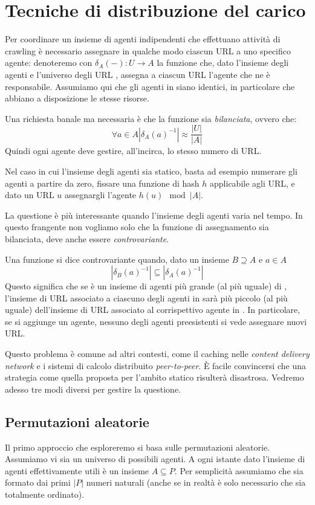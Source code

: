 \chapter{Tecniche di distribuzione del carico}
Per coordinare un insieme  di agenti indipendenti che effettuano attività di crawling è necessario assegnare in qualche modo ciascun URL a uno specifico agente: denoteremo con $\delta_A(-): U \rightarrow A$ la funzione che, dato l'insieme degli agenti  e l'universo degli URL , assegna a ciascun URL l'agente che ne è responsabile. Assumiamo qui che gli agenti in  siano identici, in particolare che abbiano a disposizione le stesse risorse.

Una richiesta banale ma necessaria è che la funzione sia \textit{bilanciata}, ovvero che:
\begin{equation}
	\forall a \in A |\delta_A({a})^{-1}| \approx \frac{|U|}{|A|}
\end{equation}
Quindi ogni agente deve gestire, all'incirca, lo stesso numero di URL.

Nel caso in cui l'insieme degli agenti sia statico, basta ad esempio numerare gli agenti a partire da zero, fissare una funzione di hash $h$ applicabile agli URL, e dato un URL $u$ assegnargli l'agente $h(u)\mod|A|$.

La questione è più interessante quando l'insieme degli agenti varia nel tempo. In questo frangente non vogliamo solo che la funzione di assegnamento sia bilanciata, deve anche essere \textit{controvariante}.

Una funzione si dice controvariante quando, dato un insieme $B \supseteq A$ e $a \in A$
\begin{equation}
	|\delta_B(a)^{-1}| \subseteq |\delta_A(a)^{-1}|
\end{equation}
Questo significa che se  è un insieme di agenti più grande (al più uguale) di , l'insieme di URL associato a ciascuno degli agenti in  sarà più piccolo (al più uguale) dell'insieme di URL associato al corrispettivo agente in . In particolare, se si aggiunge un agente, nessuno degli agenti preesistenti si vede assegnare nuovi URL.

Questo problema è comune ad altri contesti, come il caching nelle \textit{content delivery network} e i sistemi di calcolo distribuito \textit{peer-to-peer}. È facile convincersi che una strategia come quella proposta per l'ambito statico risulterà disastrosa. Vedremo adesso tre modi diversi per gestire la questione.
\section{Permutazioni aleatorie}
Il primo approccio che esploreremo si basa sulle permutazioni aleatorie. Assumiamo vi sia un universo  di possibili agenti. A ogni istante dato l'insieme di agenti effettivamente utili è un insieme $A \subseteq P$. Per semplicità assumiamo che  sia formato dai primi $|P|$ numeri naturali (anche se in realtà è solo necessario che  sia totalmente ordinato).

